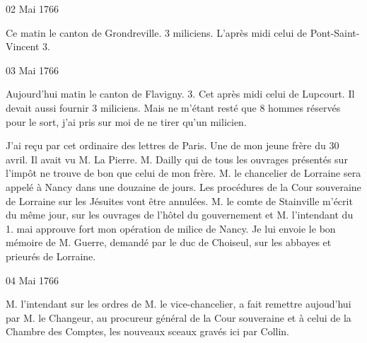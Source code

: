                      \begin{diary}{02 Mai 1766}{}
                        
                         Ce matin le canton de Grondreville. 3
                           miliciens.
                           L'après midi celui de Pont-Saint-Vincent 3. \bigskip
        
        
                     \end{diary}

                     \begin{diary}{03 Mai 1766}{}
                        
                         Aujourd'hui matin le canton de Flavigny. 3.
                           Cet après midi celui de
                              Lupcourt. Il devait
                           aussi fournir 3 miliciens. Mais ne m'étant resté
                           que 8 hommes réservés pour le sort, j'ai pris
                           sur moi de ne tirer qu'un milicien. \bigskip
        
        
                         J'ai reçu par cet ordinaire des
                           lettres de Paris.
                           Une de mon jeune frère du 30 avril. Il avait vu M.
                              La Pierre. M.
                              Dailly qui de tous les ouvrages présentés
                           sur l'impôt ne trouve de bon que celui
                              de mon frère.
                           M. le chancelier de Lorraine sera appelé à Nancy dans
                           une douzaine de jours. Les procédures de la Cour souveraine de Lorraine sur les Jésuites vont être annulées.
                           M. le comte de Stainville
                           m'écrit du même jour,
                           sur les ouvrages de l'hôtel
                              du gouvernement
                           et M. l'intendant du 1.
                              mai
                           approuve fort
                           mon opération de milice de Nancy. Je lui
                           envoie
                           le bon mémoire de M. Guerre,
                           demandé par le duc de Choiseul,
                           sur les
                           abbayes et prieurés de Lorraine. \bigskip
        
        
                     \end{diary}
                     
                     
                     \begin{diary}{04 Mai 1766}{}
                        
                        
                           M. l'intendant sur les ordres de
                              M. le
                              vice-chancelier, a fait remettre aujoud'hui
                           par M. le Changeur, au procureur général de la Cour souveraine
                           et à celui de la Chambre des Comptes, les nouveaux
                           sceaux gravés ici par Collin.
                        \bigskip
        
        
                     \end{diary}

